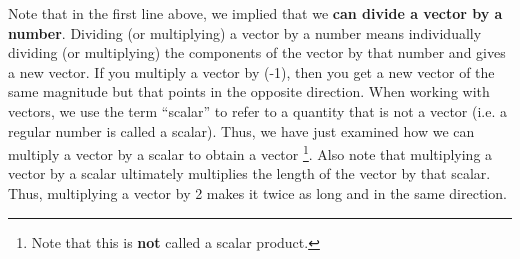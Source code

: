 Note that in the first line above, we implied that we \textbf{can divide a vector by a number}. Dividing (or multiplying) a vector by a number means individually dividing (or multiplying) the components of the vector by that number and gives a new vector. If you multiply a vector by (-1), then you get a new vector of the same magnitude but that points in the opposite direction. When working with vectors, we use the term ``scalar'' to refer to a quantity that is not a vector (i.e. a regular number is called a scalar). Thus, we have just examined how we can multiply a vector by a scalar to obtain a vector \footnote{Note that this is \textbf{not} called a scalar product.}. Also note that multiplying a vector by a scalar ultimately multiplies the length of the vector by that scalar. Thus, multiplying a vector by 2 makes it twice as long and in the same direction.

